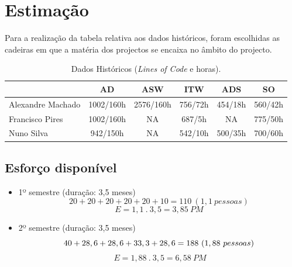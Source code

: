 \documentclass[12pt, a4paper, twoside]{report} %
\begin{document}

\section{Estimação}

Para a realização da tabela relativa aos dados históricos, foram escolhidas as cadeiras em que a matéria dos projectos se encaixa no âmbito do projecto.

\begin{table}[h]
\centering
\begin{tabular}{|l|c c c c c|}
\hline
				  & AD        & ASW       & ITW     & ADS     & SO      \\ \hline
Alexandre Machado & 1002/160h & 2576/160h & 756/72h & 454/18h & 560/42h \\ \hline
Francisco Pires   & 1002/160h & NA        & 687/5h  & NA      & 775/50h \\ \hline
Nuno Silva        & 942/150h  & NA        & 542/10h & 500/35h & 700/60h\\ \hline
\end{tabular}
\caption{ Dados Históricos (\textit{Lines of Code} e horas).}
\label{my-label}
\end{table}

\subsection{Esforço disponível}

\begin{itemize}

\item 1º semestre (duração: 3,5 meses)
\begin{equation}
20+20+20+20+20+10 = 110 \ (1,1 \ pessoas)
\end{equation}
\begin{equation}
E = 1,1 \ . \ 3,5 = 3,85 \ PM
\end{equation}
\item 2º semestre (duração: 3,5 meses)
\begin{equation}
40+28,6+28,6+33,3+28,6 = 188 \ (1,88 \ pessoas)\\
\end{equation}
\begin{equation}
\ E = 1,88 \ . \ 3,5 = 6, 58 \ PM
\end{equation}
\end{itemize}
\end{document}

